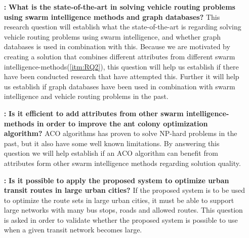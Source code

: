 \begin{itemize}

    \item[\textbf{\namedlabel{itm:RQ1}{RQ 1}:}] \textbf{What is the state-of-the-art in solving vehicle routing problems using swarm intelligence methods and graph databases?}
    \newline
    This research question will establish what the state-of-the-art is regarding solving vehicle routing problems using swarm intelligence, and whether graph databases is used in combination with this. Because we are motivated by creating a solution that combines different attributes from different swarm intelligence-methods(\ref{itm:RQ2}), this question will help us establish if there have been conducted research that have attempted this. Further it will help us establish if graph databases have been used in combination with swarm intelligence and vehicle routing problems in the past.  

    \item[\textbf{\namedlabel{itm:RQ2}{RQ 2}:}]\label{itm:RQ2} \textbf{Is it efficient to add attributes from other swarm intelligence-methods in order to improve the ant colony optimization algorithm?}
    \newline
    ACO algorithms has proven to solve NP-hard problems in the past, but it also have some well known limitations. By answering this question we will help establish if an ACO algorithm can benefit from attributes form other swarm intelligence methods regarding solution quality. 

    \item[\textbf{\namedlabel{itm:RQ3}{RQ 3}:}]\label{itm:RQ3}\textbf{Is it possible to apply the proposed system to optimize urban transit routes in large urban cities?}
    \newline
    If the proposed system is to be used to optimize the route sets in large urban cities, it must be able to support large networks with many bus stops, roads and allowed routes. This question is asked in order to validate whether the proposed system is possible to use when a given transit network becomes large. 
\end{itemize}



